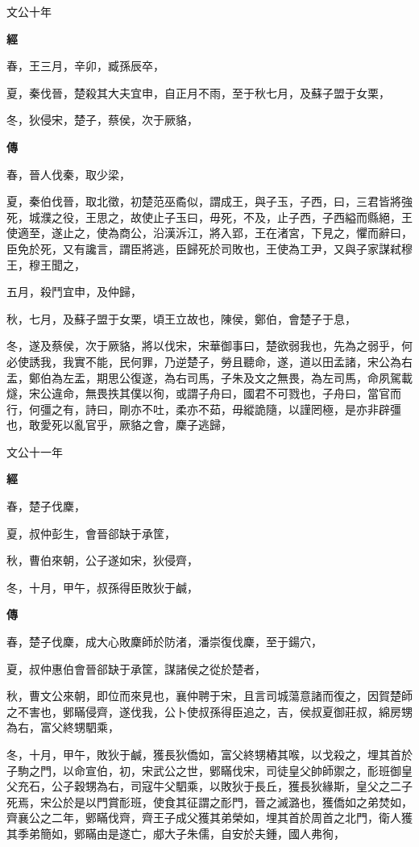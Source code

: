 \documentclass{ctexart}
\begin{document}
文公十年


\textbf{經}



春，王三月，辛卯，臧孫辰卒，

夏，秦伐晉，楚殺其大夫宜申，自正月不雨，至于秋七月，及蘇子盟于女栗，

冬，狄侵宋，楚子，蔡侯，次于厥貉，

\textbf{傳}



春，晉人伐秦，取少梁，

夏，秦伯伐晉，取北徵，初楚范巫矞似，謂成王，與子玉，子西，曰，三君皆將強死，城濮之役，王思之，故使止子玉曰，毋死，不及，止子西，子西縊而縣絕，王使適至，遂止之，使為商公，沿漢泝江，將入郢，王在渚宮，下見之，懼而辭曰，臣免於死，又有讒言，謂臣將逃，臣歸死於司敗也，王使為工尹，又與子家謀弒穆王，穆王聞之，

五月，殺鬥宜申，及仲歸，

秋，七月，及蘇子盟于女栗，頃王立故也，陳侯，鄭伯，會楚子于息，

冬，遂及蔡侯，次于厥貉，將以伐宋，宋華御事曰，楚欲弱我也，先為之弱乎，何必使誘我，我實不能，民何罪，乃逆楚子，勞且聽命，遂，道以田孟諸，宋公為右盂，鄭伯為左盂，期思公復遂，為右司馬，子朱及文之無畏，為左司馬，命夙駕載燧，宋公違命，無畏抶其僕以徇，或謂子舟曰，國君不可戮也，子舟曰，當官而行，何彊之有，詩曰，剛亦不吐，柔亦不茹，毋縱詭隨，以謹罔極，是亦非辟彊也，敢愛死以亂官乎，厥貉之會，麇子逃歸，





文公十一年


\textbf{經}



春，楚子伐麇，

夏，叔仲彭生，會晉郤缺于承筐，

秋，曹伯來朝，公子遂如宋，狄侵齊，

冬，十月，甲午，叔孫得臣敗狄于鹹，

\textbf{傳}



春，楚子伐麇，成大心敗麇師於防渚，潘崇復伐麇，至于鍚穴，

夏，叔仲惠伯會晉郤缺于承筐，謀諸侯之從於楚者，

秋，曹文公來朝，即位而來見也，襄仲聘于宋，且言司城蕩意諸而復之，因賀楚師之不害也，鄋瞞侵齊，遂伐我，公卜使叔孫得臣追之，吉，侯叔夏御莊叔，綿房甥為右，富父終甥駟乘，

冬，十月，甲午，敗狄于鹹，獲長狄僑如，富父終甥樁其喉，以戈殺之，埋其首於子駒之門，以命宣伯，初，宋武公之世，鄋瞞伐宋，司徒皇父帥師禦之，耏班御皇父充石，公子穀甥為右，司寇牛父駟乘，以敗狄于長丘，獲長狄緣斯，皇父之二子死焉，宋公於是以門賞耏班，使食其征謂之耏門，晉之滅潞也，獲僑如之弟焚如，齊襄公之二年，鄋瞞伐齊，齊王子成父獲其弟榮如，埋其首於周首之北門，衛人獲其季弟簡如，鄋瞞由是遂亡，郕大子朱儒，自安於夫鍾，國人弗徇，
\end{document}
